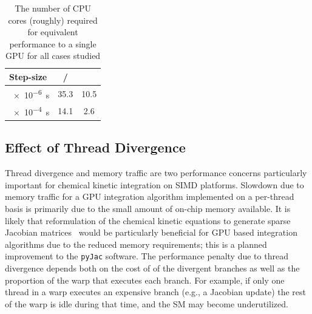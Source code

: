 \documentclass[final,twocolumn]{elsarticle}
\begin{document}
\begin{table}[htb]
\centering
\ifmeasure
\fontsize{8pt}{10pt}\selectfont
\fi
\begin{tabular}{@{}l S[table-format=2.1] S[table-format=2.1] @{}}
\toprule
Step-size &  &  \\
\midrule
\SI{e-6}{\second} & 35.3 & 10.5 \\
\SI{e-4}{\second} & 14.1 & 2.6 \\
\bottomrule
\end{tabular}
\caption{The number of CPU cores (roughly) required for equivalent performance to a single GPU for all cases studied}
\label{T:cpu_equiv}
\end{table}


\subsection{Effect of Thread Divergence}
\label{S:divergence}
Thread divergence and memory traffic are two performance concerns particularly important for chemical kinetic integration on SIMD platforms.
Slowdown due to memory traffic for a GPU integration algorithm implemented on a per-thread basis is primarily due to the small amount of on-chip memory available.
It is likely that reformulation of the chemical kinetic equations to generate sparse Jacobian matrices~\cite{Schwer2002270} would be particularly beneficial for GPU based integration algorithms due to the reduced memory requirements; this is a planned improvement to the \texttt{pyJac} software.
The performance penalty due to thread divergence depends both on the cost of of the divergent branches as well as the proportion of the warp that executes each branch.
For example, if only one thread in a warp executes an expensive branch (e.g., a Jacobian update) the rest of the warp is idle during that time, and the SM may become underutilized.
\end{document}
